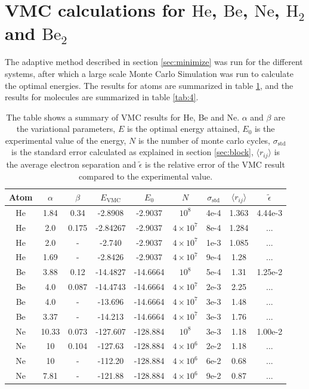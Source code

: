 \documentclass[aps,prc,twocolumn,floatfix]{revtex4}
\begin{document}
\section{VMC calculations for $\text{He}$, $\text{Be}$, $\text{Ne}$, $\text{H}_2$ and $\text{Be}_2$}
\label{sec:res}
The adaptive method described in section \ref{sec:minimize} was run for the different systems, after which a large scale Monte Carlo Simulation was run to calculate the optimal energies. The results for atoms are summarized in table \ref{tab:3}, and the results for molecules are summarized in table \ref{tab:4}.
\begin{table}
\centering
 \begin{tabular}{|ccccccccc|}
  \hline
  Atom & $\alpha$ & $\beta$ & $E_\text{VMC}$ & $E_0$ & $N$ & $\sigma_\text{std}$ & $\langle r_{ij} \rangle$ & $\tilde{\epsilon}$ \\
  \hline 
  He & 1.84 & 0.34 & -2.8908 & -2.9037 & $10^8$ & 4e-4 & 1.363 & 4.44e-3\\
  He & 2.0 & 0.175 & -2.84267 & -2.9037 & $4\times 10^7$ & 8e-4 & 1.284 & ... \\
  He & 2.0 & - & -2.740 & -2.9037 & $4\times 10^7$ & 1e-3 & 1.085 & ...  \\
  He & 1.69 & - & -2.8426 & -2.9037 & $4\times 10^7$ & 9e-4 & 1.28 & ... \\
  Be & 3.88 & 0.12 & -14.4827 & -14.6664 & $10^8$ & 5e-4 & 1.31 &  1.25e-2\\
  Be & 4.0 & 0.087 & -14.4743 & -14.6664 & $4\times 10^7$ & 2e-3 & 2.25 & ...  \\
  Be & 4.0 & - & -13.696 & -14.6664 & $4\times 10^7$ & 3e-3 & 1.48 & ...  \\
  Be & 3.37 & - & -14.213 & -14.6664 & $4\times 10^7$ & 3e-3 & 1.76 & ...  \\
  Ne & 10.33 & 0.073 & -127.607 & -128.884 & $10^8$ & 3e-3 & 1.18 & 1.00e-2\\
  Ne & 10 & 0.104 & -127.63 & -128.884 & $4\times 10^6$ & 2e-2  & 1.18 & ...\\
  Ne & 10 & - & -112.20 & -128.884 & $4\times 10^6$ & 6e-2 & 0.68 & ...\\
  Ne & 7.81 & - & -121.88 & -128.884 & $4\times 10^6$ & 9e-2 & 0.87 & ...\\
  \hline
 \end{tabular}

 \caption{The table shows a summary of VMC results for He, Be and Ne. $\alpha$ and $\beta$ are the variational parameters, $E$ is the optimal energy attained, $E_0$ is the experimental value of the energy, $N$ is the number of monte carlo cycles,   $\sigma_{\text{std}}$ is the standard error calculated as explained in section \ref{sec:block}, $\langle r_{ij} \rangle$ is the average electron separation and $\tilde{\epsilon}$ is the relative error of the VMC result compared to the experimental value.}
 \label{tab:3}
 \end{table}
\end{document}
